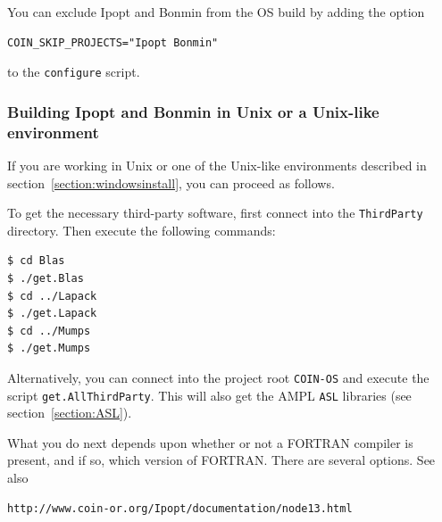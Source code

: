 \documentclass[11pt]{article}
\renewcommand{\_}{{\char"5F}}
\renewcommand{\{}{{\char"7B}}
\renewcommand{\}}{{\char"7D}}
\renewcommand{\^}{{\char"0D}}
\renewcommand{\'}{{\char"0D}}
\newif\ifipopt  \ipopttrue      %
\begin{document}
You can exclude Ipopt and Bonmin from the OS build by adding the option

\begin{verbatim}
COIN_SKIP_PROJECTS="Ipopt Bonmin"
\end{verbatim}
to the {\tt configure} script.

\ifipopt
\subsubsection{Building Ipopt and Bonmin in Unix or a Unix-like environment} \label{section:ipopt-unix}
If you are working in Unix or one of the Unix-like environments described in
section~\ref{section:windowsinstall}, you can proceed as follows.
\else
If you do choose to build {\tt Ipopt} and {\tt Bonmin}, it is best to work in Unix or one of the Unix-like environments 
described in section~\ref{section:windowsinstall} (we recommend MSYS)\index{MSYS}. 
\fi
To get the necessary third-party software, first 
connect into the {\tt ThirdParty} directory. Then execute the following commands:

\begin{verbatim}
$ cd Blas
$ ./get.Blas
$ cd ../Lapack
$ ./get.Lapack
$ cd ../Mumps
$ ./get.Mumps
\end{verbatim}

Alternatively, you can connect into the project root {\tt COIN-OS} and execute the script {\tt get.AllThirdParty}.  
This will also get the AMPL {\tt ASL} libraries (see section~\ref{section:ASL}).

What you do next depends upon whether or not a FORTRAN compiler is present, and if so, which version 
of FORTRAN.  There are several options. See also

\begin{verbatim}
http://www.coin-or.org/Ipopt/documentation/node13.html
\end{verbatim}
\end{document}
